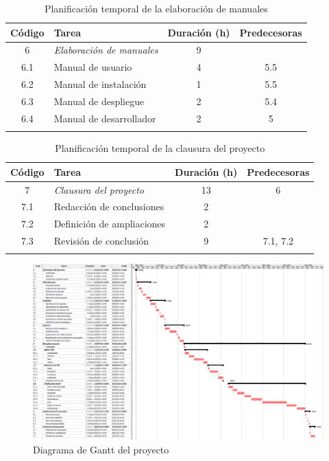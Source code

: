\begin{longtable}{ c p{} c c }
    \hline
    Código & Tarea & Duración (h) & Predecesoras \\
    \hline
    6 & \emph{Elaboración de manuales} & 9 & \\
    6.1 & Manual de usuario & 4 & 5.5 \\
    6.2 & Manual de instalación & 1 & 5.5 \\
    6.3 & Manual de despliegue & 2 & 5.4 \\
    6.4 & Manual de desarrollador & 2 & 5 \\
    \hline
    \caption{Planificación temporal de la elaboración de manuales}
    \label{pt:manuales}
\end{longtable}

\begin{longtable}{ c p{} c c }
    \hline
    Código & Tarea & Duración (h) & Predecesoras \\
    \hline
    7 & \emph{Clausura del proyecto} & 13 & 6 \\
    7.1 & Redacción de conclusiones & 2 &  \\
    7.2 & Definición de ampliaciones & 2 &  \\
    7.3 & Revisión de conclusión & 9 & 7.1, 7.2 \\
    \hline
    \caption{Planificación temporal de la clausura del proyecto}
    \label{pt:clausura}
\end{longtable}

\begin{figure}
    \centering
    \includegraphics[width=1\textwidth]{images/Anexos/DiagramaGantt.png}
    \caption{Diagrama de Gantt del proyecto}
    \label{dia:gantt}
\end{figure}